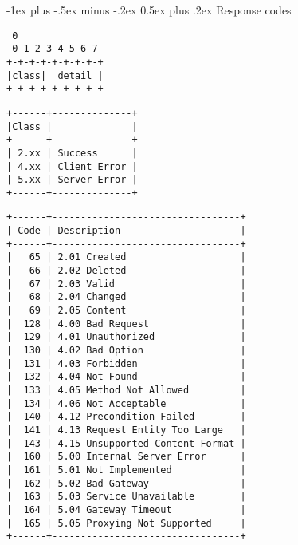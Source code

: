 \documentclass[10pt,landscape]{article}
\makeatletter
\renewcommand{\section}{\@startsection{section}{1}{0mm}%
                                {-1ex plus -.5ex minus -.2ex}%
                                {0.5ex plus .2ex}%
                                {\normalfont\large\bfseries}}
\makeatother
\begin{document}
\begin{multicols}{3}
\section{Response codes}

{\tiny
\begin{verbatim}
 0
 0 1 2 3 4 5 6 7
+-+-+-+-+-+-+-+-+
|class|  detail |
+-+-+-+-+-+-+-+-+
\end{verbatim}
}

{\tiny
\begin{verbatim}
+------+--------------+
|Class |              |
+------+--------------+
| 2.xx | Success      |
| 4.xx | Client Error |
| 5.xx | Server Error |
+------+--------------+
\end{verbatim}
}

{\tiny
\begin{verbatim}
+------+---------------------------------+
| Code | Description                     |
+------+---------------------------------+
|   65 | 2.01 Created                    |
|   66 | 2.02 Deleted                    |
|   67 | 2.03 Valid                      |
|   68 | 2.04 Changed                    |
|   69 | 2.05 Content                    |
|  128 | 4.00 Bad Request                |
|  129 | 4.01 Unauthorized               |
|  130 | 4.02 Bad Option                 |
|  131 | 4.03 Forbidden                  |
|  132 | 4.04 Not Found                  |
|  133 | 4.05 Method Not Allowed         |
|  134 | 4.06 Not Acceptable             |
|  140 | 4.12 Precondition Failed        |
|  141 | 4.13 Request Entity Too Large   |
|  143 | 4.15 Unsupported Content-Format |
|  160 | 5.00 Internal Server Error      |
|  161 | 5.01 Not Implemented            |
|  162 | 5.02 Bad Gateway                |
|  163 | 5.03 Service Unavailable        |
|  164 | 5.04 Gateway Timeout            |
|  165 | 5.05 Proxying Not Supported     |
+------+---------------------------------+
\end{verbatim}
}


\end{multicols}
\end{document}
